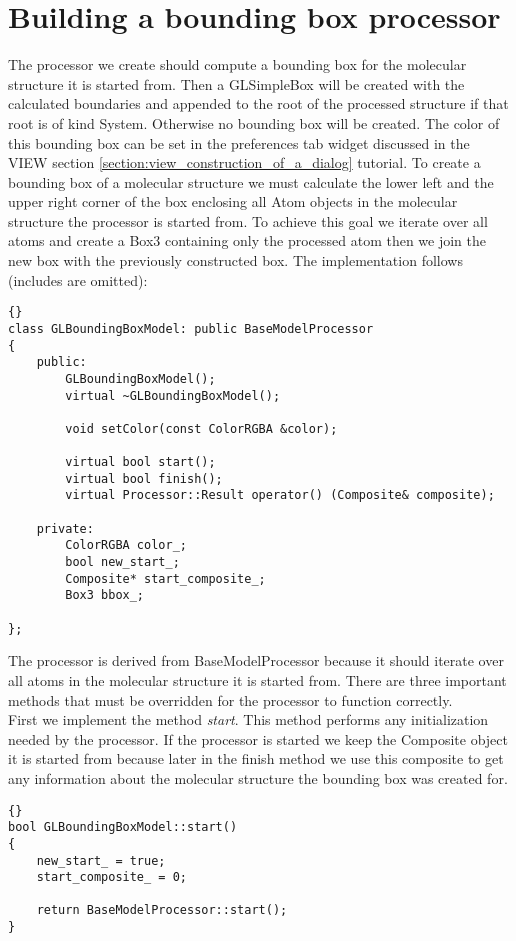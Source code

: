 \section{Building a bounding box processor}
\label{section:bounding_box_processor}

The processor we create should compute a bounding box for the molecular structure
it is started from. Then a GLSimpleBox will be created with the calculated
boundaries and appended to the root of the processed structure if that root is
of kind System. Otherwise no bounding box will be created. The color of this
bounding box can be set in the preferences tab widget discussed in the VIEW section 
\ref{section:view_construction_of_a_dialog} tutorial.
To create a bounding box of a molecular structure we must calculate the lower left 
and the upper right corner of the box enclosing all Atom objects in the molecular
structure the processor is started from. To achieve this goal we iterate over all atoms
and create a Box3 containing only the processed atom then we join the new box
with the previously constructed box.
The implementation follows (includes are omitted):

\begin{lstlisting}{}
class GLBoundingBoxModel: public BaseModelProcessor
{
	public:
		GLBoundingBoxModel();
		virtual ~GLBoundingBoxModel();

		void setColor(const ColorRGBA &color);

		virtual bool start();
		virtual bool finish();
		virtual Processor::Result operator() (Composite& composite);

	private:
		ColorRGBA color_;
		bool new_start_;
		Composite* start_composite_;
		Box3 bbox_;

};
\end{lstlisting}

The processor is derived from BaseModelProcessor because
it should iterate over all atoms in the molecular structure it is started from.
There are three important methods that must be overridden for the processor
to function correctly.\\
First we implement the method {\em start}. This method performs any initialization
needed by the processor. If the processor is started we keep the Composite object
it is started from because later in the finish method we use this composite to get
any information about the molecular structure the bounding box was created for.

\begin{lstlisting}{}
bool GLBoundingBoxModel::start()
{
	new_start_ = true;
	start_composite_ = 0;

	return BaseModelProcessor::start();
}
\end{lstlisting}

